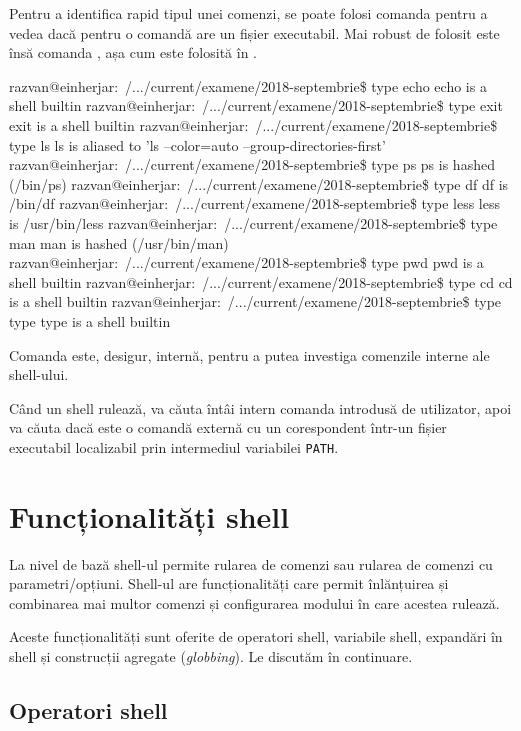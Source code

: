 Pentru a identifica rapid tipul unei comenzi, se poate folosi comanda 
pentru a vedea dacă pentru o comandă are un fișier executabil. Mai robust de
folosit este însă comanda , așa cum este folosită în .

\begin{screen}[caption={Tipul unei comenzi (type)},label={lst:cli:type}]
razvan@einherjar:~/.../current/examene/2018-septembrie\$ type echo
echo is a shell builtin
razvan@einherjar:~/.../current/examene/2018-septembrie\$ type exit
exit is a shell builtin
razvan@einherjar:~/.../current/examene/2018-septembrie\$ type ls
ls is aliased to 'ls --color=auto --group-directories-first'
razvan@einherjar:~/.../current/examene/2018-septembrie\$ type ps
ps is hashed (/bin/ps)
razvan@einherjar:~/.../current/examene/2018-septembrie\$ type df
df is /bin/df
razvan@einherjar:~/.../current/examene/2018-septembrie\$ type less
less is /usr/bin/less
razvan@einherjar:~/.../current/examene/2018-septembrie\$ type man
man is hashed (/usr/bin/man)
razvan@einherjar:~/.../current/examene/2018-septembrie\$ type pwd
pwd is a shell builtin
razvan@einherjar:~/.../current/examene/2018-septembrie\$ type cd
cd is a shell builtin
razvan@einherjar:~/.../current/examene/2018-septembrie\$ type type
type is a shell builtin
\end{screen}

Comanda  este, desigur, internă, pentru a putea investiga comenzile interne
ale shell-ului.

Când un shell rulează, va căuta întâi intern comanda introdusă de utilizator,
apoi va căuta dacă este o comandă externă cu un corespondent într-un fișier
executabil localizabil prin intermediul variabilei \texttt{PATH}.

\section{Funcționalități shell}
\label{sec:cli-shell-func}

La nivel de bază shell-ul permite rularea de comenzi sau rularea de comenzi cu
parametri/opțiuni. Shell-ul are funcționalități care permit înlănțuirea și
combinarea mai multor comenzi și configurarea modului în care acestea rulează.

Aceste funcționalități sunt oferite de operatori shell, variabile shell,
expandări în shell și construcții agregate (\textit{globbing}). Le discutăm în
continuare.

\subsection{Operatori shell}
\label{sec:cli-operators}

